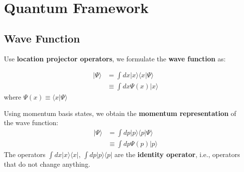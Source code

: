 \section{Quantum Framework}
\subsection{Wave Function}
Use \textbf{location projector operators}, we formulate the \textbf{wave function} as:
\begin{qt}
    \begin{equation}
\begin{aligned}
|\Psi\rangle &=\int d x|x\rangle\langle x | \Psi\rangle \\
& \equiv \int d x \Psi(x)|x\rangle
\end{aligned}
\end{equation}
where $\Psi(x) \equiv\langle x | \Psi\rangle$
\end{qt}

Using momentum basis states, we obtain the \textbf{momentum representation} of the wave function:
\begin{equation}
\begin{aligned}
|\Psi\rangle &=\int d p|p\rangle\langle p | \Psi\rangle \\
& \equiv \int d p \Psi(p)|p\rangle
\end{aligned}
\end{equation}
The operators $\int d x|x\rangle\langle x|$, $\int d p|p\rangle\langle p|$ are the \textbf{identity operator}, i.e., operators that do not change anything.

